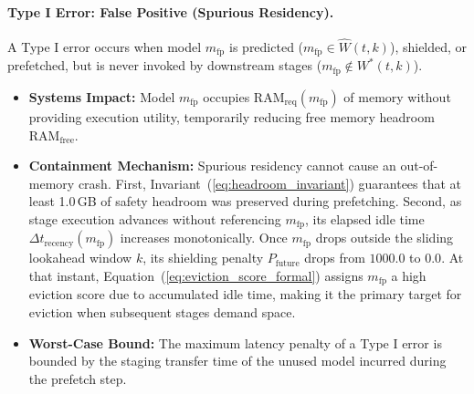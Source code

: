 \paragraph{Type I Error: False Positive (Spurious Residency).}
A Type I error occurs when model $m_{\text{fp}}$ is predicted ($m_{\text{fp}} \in \widehat{W}(t, k)$), shielded, or prefetched, but is never invoked by downstream stages ($m_{\text{fp}} \notin W^*(t, k)$).
\begin{itemize}
    \item \textbf{Systems Impact:} Model $m_{\text{fp}}$ occupies $\text{RAM}_{\text{req}}(m_{\text{fp}})$ of memory without providing execution utility, temporarily reducing free memory headroom $\text{RAM}_{\text{free}}$.
    \item \textbf{Containment Mechanism:} Spurious residency cannot cause an out-of-memory crash. First, Invariant~(\ref{eq:headroom_invariant}) guarantees that at least 1.0\,GB of safety headroom was preserved during prefetching. Second, as stage execution advances without referencing $m_{\text{fp}}$, its elapsed idle time $\Delta t_{\text{recency}}(m_{\text{fp}})$ increases monotonically. Once $m_{\text{fp}}$ drops outside the sliding lookahead window $k$, its shielding penalty $P_{\text{future}}$ drops from $1000.0$ to $0.0$. At that instant, Equation~(\ref{eq:eviction_score_formal}) assigns $m_{\text{fp}}$ a high eviction score due to accumulated idle time, making it the primary target for eviction when subsequent stages demand space.
    \item \textbf{Worst-Case Bound:} The maximum latency penalty of a Type I error is bounded by the staging transfer time of the unused model incurred during the prefetch step.
\end{itemize}

